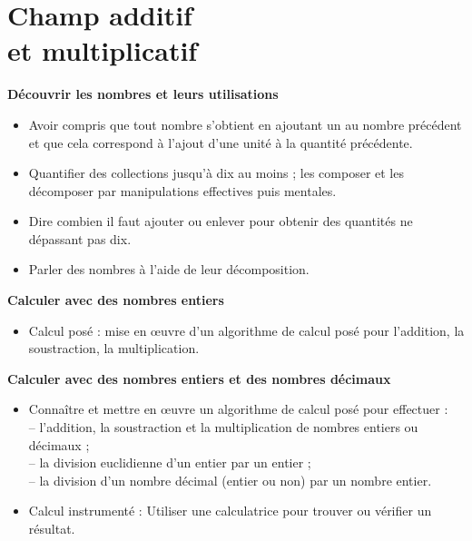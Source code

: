 \chapter{Champ additif\\et multiplicatif} \label{Num3}

\begin{prerequis}
   {\bf Découvrir les nombres et leurs utilisations}
   \begin{itemize}
     \item Avoir compris que tout nombre s'obtient en ajoutant un au nombre précédent et que cela correspond à l'ajout d'une unité à la quantité précédente.
      \item Quantifier des collections jusqu'à dix au moins ; les composer et les décomposer par manipulations effectives puis mentales.
      \item Dire combien il faut ajouter ou enlever pour obtenir des quantités ne dépassant pas dix.
      \item Parler des nombres à l'aide de leur décomposition.
   \end{itemize}
\end{prerequis}

\begin{prerequis}
{\bf Calculer avec des nombres entiers}
   \begin{itemize}
      \item Calcul posé : mise en \oe uvre d'un algorithme de calcul posé pour l'addition, la soustraction, la multiplication.
   \end{itemize}
\end{prerequis}
  
\begin{prerequis}
{\small
{\bf Calculer avec des nombres entiers et des nombres décimaux}
   \begin{itemize}
      \item Connaître et mettre en œuvre un algorithme de calcul posé pour effectuer : \\
         -- l’addition, la soustraction et la multiplication de nombres entiers ou décimaux ; \\
         -- la division euclidienne d’un entier par un entier ; \\
         -- la division d’un nombre décimal (entier ou non) par un nombre entier. 
      \item Calcul instrumenté : Utiliser une calculatrice pour trouver ou vérifier un résultat.
\end{itemize}
   }
\end{prerequis}

